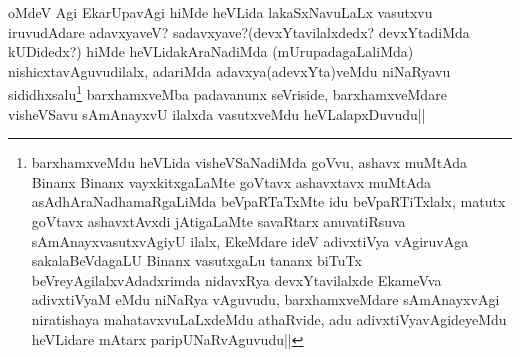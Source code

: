 \begin{artha}
oMdeV Agi EkarUpavAgi hiMde heVLida lakaSxNavuLaLx vasutxvu iruvudAdare adavxyaveV? sadavxyave?(devxYtavilalxdedx? devxYtadiMda kUDidedx?) hiMde heVLidakAraNadiMda (mUrupadagaLaliMda) nishicxtavAguvudilalx, adariMda adavxya(adevxYta)veMdu niNaRyavu sididhxsalu\footnote{barxhamxveMdu heVLida visheVSaNadiMda goVvu, ashavx muMtAda Binanx Binanx vayxkitxgaLaMte goVtavx ashavxtavx muMtAda asAdhAraNadhamaRgaLiMda beVpaRTaTxMte idu beVpaRTiTxlalx, matutx goVtavx ashavxtAvxdi jAtigaLaMte savaRtarx anuvatiRsuva sAmAnayxvasutxvAgiyU ilalx, EkeMdare ideV adivxtiVya vAgiruvAga sakalaBeVdagaLU Binanx vasutxgaLu tananx biTuTx beVreyAgilalxvAdadxrimda nidavxRya devxYtavilalxde EkameVva adivxtiVyaM eMdu niNaRya vAguvudu, barxhamxveMdare sAmAnayxvAgi niratishaya mahatavxvuLaLxdeMdu athaRvide, adu adivxtiVyavAgideyeMdu heVLidare mAtarx paripUNaRvAguvudu||} barxhamxveMba padavanunx seVriside, barxhamxveMdare visheVSavu sAmAnayxvU ilalxda vasutxveMdu heVLalapxDuvudu||
\end{artha}
